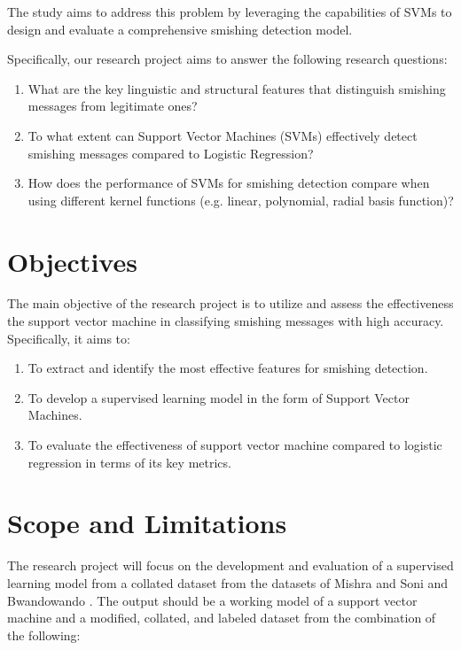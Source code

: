 \documentclass[conference]{IEEEtran}
\begin{document}
The study aims to address this problem by leveraging the capabilities of SVMs to design and evaluate a comprehensive smishing detection model.

Specifically, our research project aims to answer the following research questions: 

\begin{enumerate}
    \item What are the key linguistic and structural features that distinguish smishing messages from legitimate ones?
    \item To what extent can Support Vector Machines (SVMs) effectively detect smishing messages compared to Logistic Regression?
    \item How does the performance of SVMs for smishing detection compare when using different kernel functions (e.g. linear, polynomial, radial basis function)?
\end{enumerate}

\section{Objectives}

The main objective of the research project is to utilize and assess the effectiveness the support vector machine in classifying smishing messages with high accuracy. Specifically, it aims to:

\begin{enumerate}
    \item To extract and identify the most effective features for smishing detection.
    \item To develop a supervised learning model in the form of Support Vector Machines.
    \item To evaluate the effectiveness of support vector machine compared to logistic regression in terms of its key metrics.
\end{enumerate}

\section{Scope and Limitations}

The research project will focus on the development and evaluation of a supervised learning model from a collated dataset from the datasets of Mishra and Soni \cite{mishra2022} and Bwandowando \cite{bwandowando2023}. The output should be a working model of a support vector machine and a modified, collated, and labeled dataset from the combination of the following:
\end{document}
